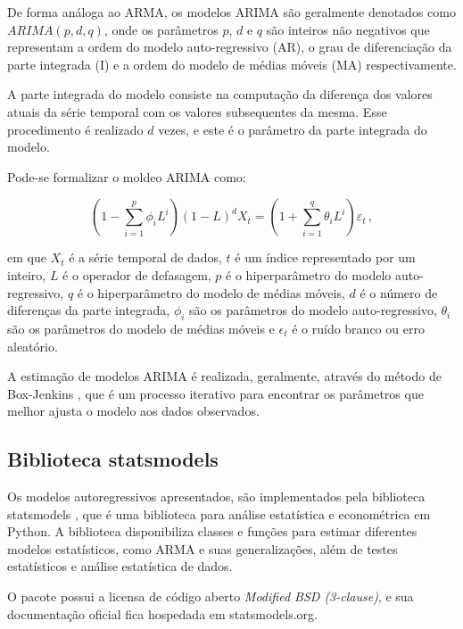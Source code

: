 De forma análoga ao ARMA, os modelos ARIMA são geralmente denotados como $ARIMA(p, d, q)$, onde os parâmetros $p$, $d$ e $q$ são inteiros não negativos que representam a ordem do modelo auto-regressivo (AR), o grau de diferenciação da parte integrada (I) e a ordem do modelo de médias móveis (MA) respectivamente.

A parte integrada do modelo consiste na computação da diferença dos valores atuais da série temporal com os valores subsequentes da mesma. Esse procedimento é realizado $d$ vezes, e este é o parâmetro da parte integrada do modelo.

Pode-se formalizar o moldeo ARIMA como:

\begin{equation}
    \left(1-\sum_{i=1}^{p} \phi_{i} L^{i}\right)(1-L)^{d} X_{t}=\left(1+\sum_{i=1}^{q} \theta_{i} L^{i}\right) \varepsilon_{t}\, ,
\end{equation}

em que $X_{t}$ é a série temporal de dados, $t$ é um índice representado por um inteiro, $L$ é o operador de defasagem, $p$ é o hiperparâmetro do modelo auto-regressivo, $q$ é o hiperparâmetro do modelo de médias móveis, $d$ é o número de diferenças da parte integrada, $\phi_{i}$ são os parâmetros do modelo auto-regressivo, $\theta_{i}$ são os parâmetros do modelo de médias móveis e $\epsilon_{t}$ é o ruído branco ou erro aleatório.

A estimação de modelos ARIMA é realizada, geralmente, através do método de Box-Jenkins \cite{box&jenkins}, que é um processo iterativo para encontrar os parâmetros que melhor ajusta o modelo aos dados observados.

\subsection{Biblioteca statsmodels}
Os modelos autoregressivos apresentados, são implementados pela biblioteca statsmodels \cite{seabold2010statsmodels}, que é uma biblioteca para análise estatística e econométrica em Python. A biblioteca disponibiliza classes e funções para estimar diferentes modelos estatísticos, como ARMA e suas generalizações, além de testes estatísticos e análise estatística de dados.

O pacote possui a licensa de código aberto \textit{Modified BSD (3-clause)}, e sua documentação oficial fica hospedada em statsmodels.org.


